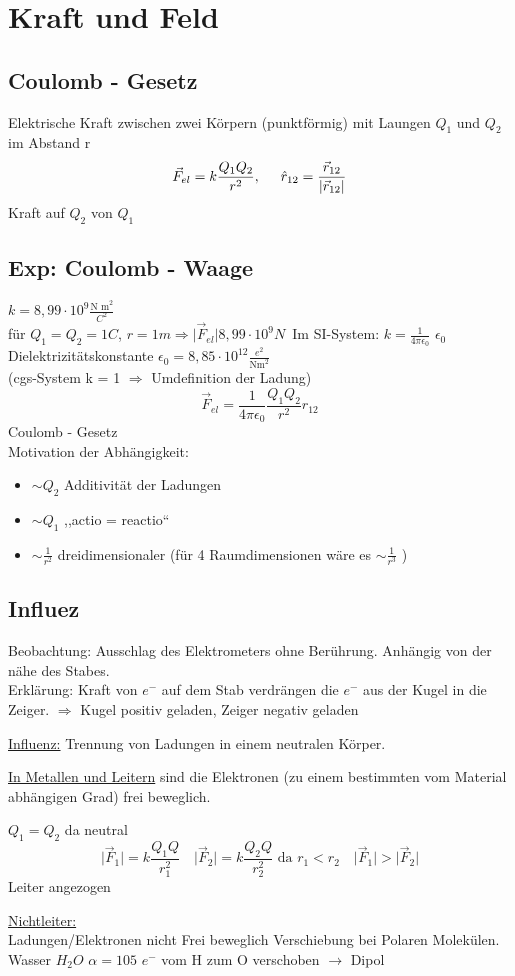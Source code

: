 \documentclass[titlepage,12pt,a4paper,ngerman]{report}
\newcommand{\tx}[1]{\textrm{#1}}
\begin{document}
\section{Kraft und Feld}
\subsection{Coulomb - Gesetz}
Elektrische Kraft zwischen zwei Körpern (punktförmig) mit Laungen $Q_1$ und $Q_2$ im Abstand r
$$\vec{F}_{el} = k \frac{Q_1 Q_2}{r^2} , \hspace{0.5cm}\hat{r}_{12} = \frac{\vec{r}_{12}}{\vert\vec{r}_{12} \vert }$$
Kraft auf $Q_2$ von $Q_1$ 
\subsection*{Exp: Coulomb - Waage}
$k = 8,99 \cdot 10^{9} \frac{\tx{N m}^2}{C^2}$\\
für $Q_1 = Q_2  =1C$, $r =1m \Rightarrow \vert \vec{F}_{el} \vert 8,99 \cdot 10^{9} N$\
Im SI-System: $k = \frac{1}{4 \pi \epsilon_0}$
$\epsilon_0$ \\
Dielektrizitätskonstante $\epsilon_0 = 8,85 \cdot 10^{12} \frac{e^2}{\tx{Nm}^2}$\\
(cgs-System k = 1 $\Rightarrow$ Umdefinition der Ladung)
$$\vec{F}_{el} = \frac{1}{4 \pi \epsilon_0 } \frac{Q_1 Q_2}{r^2}\hat{r}_{12}$$ Coulomb - Gesetz\\
Motivation der Abhängigkeit:
\begin{itemize}
\item $\sim Q_2$ Additivität der Ladungen
\item $\sim Q_1$ ,,actio = reactio``
\item $\sim \frac{1}{r^2}$ dreidimensionaler (für 4 Raumdimensionen wäre es $\sim \frac{1}{r^3}$ )
\end{itemize}

\subsection{Influez}
Beobachtung: Ausschlag des Elektrometers ohne Berührung. Anhängig von der nähe des Stabes.\\
Erklärung: Kraft von $e^-$ auf dem Stab verdrängen die $e^-$ aus der Kugel in die Zeiger. $\Rightarrow$ Kugel positiv geladen, Zeiger negativ geladen\\\par
\underline{Influenz:} Trennung von Ladungen in einem neutralen Körper.\\\par
\underline{In Metallen und Leitern} sind die Elektronen (zu einem bestimmten vom Material abhängigen Grad) frei beweglich.\par
$Q_1 = Q_2$ da neutral $$\vert \vec{F}_1 \vert = k \frac{Q_1 Q}{r_1^2} \quad \vert \vec{F}_2 \vert = k \frac{Q_2 Q}{r_2^2} \tx{ da } r_1 < r_2 \quad \vert \vec{F}_1 \vert > \vert \vec{F}_2 \vert$$ Leiter angezogen\par
\underline{Nichtleiter:} \\
Ladungen/Elektronen nicht Frei beweglich Verschiebung bei Polaren Molekülen. Wasser $H_2 O$ $\alpha = 105$ $e^-$ vom H zum O verschoben $\rightarrow$ Dipol\\
\end{document}

